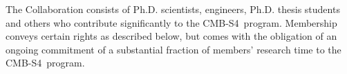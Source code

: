 \documentclass[12pt]{article}
\newcommand\collabname{CMB-S4}
\begin{document}
The Collaboration consists of Ph.D. scientists, engineers, Ph.D. thesis students %
and others who contribute significantly to the \collabname\ program. Membership conveys certain rights as described below, but comes with the obligation of an ongoing commitment of a substantial fraction of members' research time to the \collabname\ program.

\vspace{0.2in}
\noindent


\end{document}

